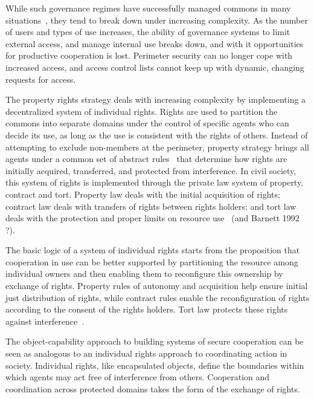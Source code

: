 \documentclass{llncs}
\begin{document}
While such governance regimes have successfully managed commons in many situations~\cite{ostrom1990governing}, they tend to break down under increasing complexity. As the number of users and types of use increases, the ability of governance systems to limit external access, and manage internal use breaks down, and with it opportunities for productive cooperation is lost. Perimeter security can no longer cope with increased access, and access control lists cannot keep up with dynamic, changing requests for access.

The property rights strategy deals with increasing complexity by implementing a decentralized system of individual rights.  Rights are used to partition the commons into separate domains under the control of specific agents who can decide its use, as long as the use is consistent with the rights of others. Instead of attempting to exclude non-members at the perimeter, property strategy brings all agents under a common set of abstract rules~\cite{hayek2012law} that determine how rights are initially acquired, transferred, and protected from interference. In civil society, this system of rights is implemented through the private law system of property, contract and tort.  Property law deals with the initial acquisition of rights; contract law deals with transfers of rights between rights holders; and tort law deals with the protection and proper limits on resource use~\cite{barnett1986consent} (and Barnett 1992 ?).

The basic logic of a system of individual rights starts from the proposition that cooperation in use can be better supported by partitioning the resource among individual owners and then enabling them to reconfigure this ownership by exchange of rights. Property rules of autonomy and acquisition help ensure initial just distribution of rights, while contract rules enable the reconfiguration of rights according to the consent of the rights holders. Tort law protects these rights against interference~\cite{epstein1997simple}.


The object-capability approach to building systems of secure cooperation can be seen as analogous to an individual rights approach to coordinating action in society. Individual rights, like encapsulated objects, define the boundaries within which agents may act free of interference from others. Cooperation and coordination across protected domains takes the form of the exchange of rights.
\end{document}
